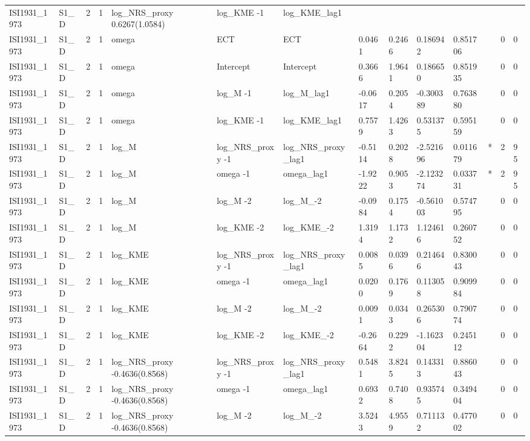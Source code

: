 \begin{tabular}{llllllllllllll}
ISI1931\_1973 & S1\_D & 2 & 1 & log\_NRS\_proxy 0.6267(1.0584) & log\_KME -1 & log\_KME\_lag1 &  &  &  &  &  &  &  \\
ISI1931\_1973 & S1\_D & 2 & 1 & omega & ECT & ECT & 0.0461 & 0.2466 & 0.186942 & 0.851706 &  & 0 & 0 \\
ISI1931\_1973 & S1\_D & 2 & 1 & omega & Intercept & Intercept & 0.3666 & 1.9641 & 0.186650 & 0.851935 &  & 0 & 0 \\
ISI1931\_1973 & S1\_D & 2 & 1 & omega & log\_M -1 & log\_M\_lag1 & -0.0617 & 0.2054 & -0.300389 & 0.763880 &  & 0 & 0 \\
ISI1931\_1973 & S1\_D & 2 & 1 & omega & log\_KME -1 & log\_KME\_lag1 & 0.7579 & 1.4263 & 0.531375 & 0.595159 &  & 0 & 0 \\
ISI1931\_1973 & S1\_D & 2 & 1 & log\_M & log\_NRS\_proxy -1 & log\_NRS\_proxy\_lag1 & -0.5114 & 0.2028 & -2.521696 & 0.011679 & * & 2 & 95 \\
ISI1931\_1973 & S1\_D & 2 & 1 & log\_M & omega -1 & omega\_lag1 & -1.9222 & 0.9053 & -2.123274 & 0.033731 & * & 2 & 95 \\
ISI1931\_1973 & S1\_D & 2 & 1 & log\_M & log\_M -2 & log\_M\_-2 & -0.0984 & 0.1754 & -0.561003 & 0.574795 &  & 0 & 0 \\
ISI1931\_1973 & S1\_D & 2 & 1 & log\_M & log\_KME -2 & log\_KME\_-2 & 1.3194 & 1.1732 & 1.124616 & 0.260752 &  & 0 & 0 \\
ISI1931\_1973 & S1\_D & 2 & 1 & log\_KME & log\_NRS\_proxy -1 & log\_NRS\_proxy\_lag1 & 0.0085 & 0.0396 & 0.214646 & 0.830043 &  & 0 & 0 \\
ISI1931\_1973 & S1\_D & 2 & 1 & log\_KME & omega -1 & omega\_lag1 & 0.0200 & 0.1769 & 0.113058 & 0.909984 &  & 0 & 0 \\
ISI1931\_1973 & S1\_D & 2 & 1 & log\_KME & log\_M -2 & log\_M\_-2 & 0.0091 & 0.0343 & 0.265306 & 0.790774 &  & 0 & 0 \\
ISI1931\_1973 & S1\_D & 2 & 1 & log\_KME & log\_KME -2 & log\_KME\_-2 & -0.2664 & 0.2292 & -1.162304 & 0.245112 &  & 0 & 0 \\
ISI1931\_1973 & S1\_D & 2 & 1 & log\_NRS\_proxy -0.4636(0.8568) & log\_NRS\_proxy -1 & log\_NRS\_proxy\_lag1 & 0.5481 & 3.8245 & 0.143313 & 0.886043 &  & 0 & 0 \\
ISI1931\_1973 & S1\_D & 2 & 1 & log\_NRS\_proxy -0.4636(0.8568) & omega -1 & omega\_lag1 & 0.6932 & 0.7408 & 0.935745 & 0.349404 &  & 0 & 0 \\
ISI1931\_1973 & S1\_D & 2 & 1 & log\_NRS\_proxy -0.4636(0.8568) & log\_M -2 & log\_M\_-2 & 3.5243 & 4.9559 & 0.711132 & 0.477002 &  & 0 & 0 \\

\end{tabular}
